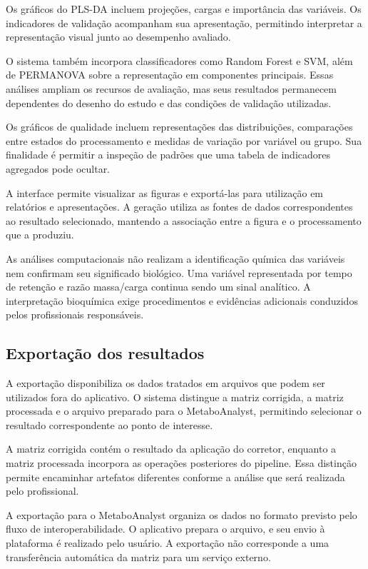 Os gráficos do PLS-DA incluem projeções, cargas e importância das variáveis. Os indicadores de validação acompanham sua apresentação, permitindo interpretar a representação visual junto ao desempenho avaliado.

O sistema também incorpora classificadores como Random Forest e SVM, além de PERMANOVA sobre a representação em componentes principais. Essas análises ampliam os recursos de avaliação, mas seus resultados permanecem dependentes do desenho do estudo e das condições de validação utilizadas.

Os gráficos de qualidade incluem representações das distribuições, comparações entre estados do processamento e medidas de variação por variável ou grupo. Sua finalidade é permitir a inspeção de padrões que uma tabela de indicadores agregados pode ocultar.

A interface permite visualizar as figuras e exportá-las para utilização em relatórios e apresentações. A geração utiliza as fontes de dados correspondentes ao resultado selecionado, mantendo a associação entre a figura e o processamento que a produziu.

As análises computacionais não realizam a identificação química das variáveis nem confirmam seu significado biológico. Uma variável representada por tempo de retenção e razão massa/carga continua sendo um sinal analítico. A interpretação bioquímica exige procedimentos e evidências adicionais conduzidos pelos profissionais responsáveis.

\subsection{Exportação dos resultados}
\label{subsec:exportacao-resultados}

A exportação disponibiliza os dados tratados em arquivos que podem ser utilizados fora do aplicativo. O sistema distingue a matriz corrigida, a matriz processada e o arquivo preparado para o MetaboAnalyst, permitindo selecionar o resultado correspondente ao ponto de interesse.

A matriz corrigida contém o resultado da aplicação do corretor, enquanto a matriz processada incorpora as operações posteriores do pipeline. Essa distinção permite encaminhar artefatos diferentes conforme a análise que será realizada pelo profissional.

A exportação para o MetaboAnalyst organiza os dados no formato previsto pelo fluxo de interoperabilidade. O aplicativo prepara o arquivo, e seu envio à plataforma é realizado pelo usuário. A exportação não corresponde a uma transferência automática da matriz para um serviço externo.

